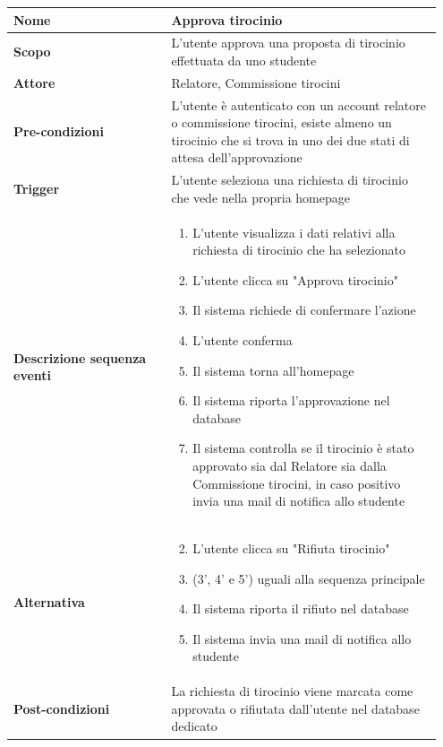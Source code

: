 \documentclass[12pt]{article}
\begin{document}
 \begin{longtable}{|p{0.35\linewidth} | p{0.6\linewidth}|}
 \hline
 \textbf{Nome} & Approva tirocinio \\ \hline
 \textbf{Scopo} & L'utente approva una proposta di tirocinio effettuata da uno studente  \\ \hline
  \textbf{Attore} & Relatore, Commissione tirocini \\ \hline
  \textbf{Pre-condizioni} & L'utente è autenticato con un account relatore o commissione tirocini, esiste almeno un tirocinio che si trova in uno dei due stati di attesa dell'approvazione \\ \hline
  \textbf{Trigger} & L'utente seleziona una richiesta di tirocinio che vede nella propria homepage \\ \hline
  \textbf{Descrizione sequenza eventi} &
  \begin{enumerate}[label=(\arabic*)]
      \item L'utente visualizza i dati relativi alla richiesta di tirocinio che ha selezionato
      \item L'utente clicca su "Approva tirocinio"
      \item Il sistema richiede di confermare l'azione
      \item L'utente conferma
      \item Il sistema torna all'homepage
      \item Il sistema riporta l'approvazione nel database
      \item Il sistema controlla se il tirocinio è stato approvato sia dal Relatore sia dalla Commissione tirocini, in caso positivo invia una mail di notifica allo studente
  \end{enumerate} \\ \hline
  \textbf{Alternativa} &
  \begin{enumerate}[label=(\arabic*')]
      \setcounter{enumi}{1}
      \item L'utente clicca su "Rifiuta tirocinio"
      \item (3', 4' e 5') uguali alla sequenza principale
      \setcounter{enumi}{5}
      \item Il sistema riporta il rifiuto nel database
      \item Il sistema invia una mail di notifica allo studente
  \end{enumerate} \\ \hline
  \textbf{Post-condizioni} & La richiesta di tirocinio viene marcata come approvata o rifiutata dall'utente nel database dedicato \\ \hline
 \end{longtable}
\end{document}

